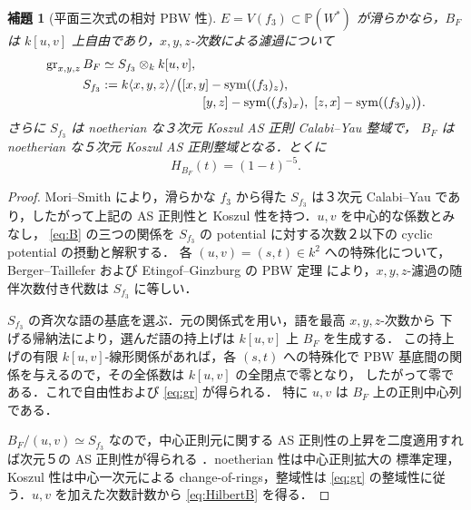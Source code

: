\documentclass[11pt,a4paper]{ltjsarticle}
\numberwithin{equation}{section}
\newtheorem{lemma}[theorem]{補題}
\newcommand{\PP}{\mathbb P}
\newcommand{\gr}{\operatorname{gr}}
\newcommand{\Symm}{\operatorname{sym}}
\begin{document}
\begin{lemma}[平面三次式の相対 PBW 性]\label{lem:pbw}
$E=V(f_3)\subset\PP(W^*)$ が滑らかなら，$B_F$ は
$k[u,v]$ 上自由であり，$x,y,z$-次数による濾過について
\begin{align}\label{eq:gr}
 \gr_{x,y,z}B_F&\simeq S_{f_3}\otimes_k k[u,v],\\
 S_{f_3}&:=k\langle x,y,z\rangle/\bigl([x,y]-\Symm((f_3)_z),\ 
\notag\\[-2pt]
 &\hspace{8em}[y,z]-\Symm((f_3)_x),\ [z,x]-\Symm((f_3)_y)\bigr).
\end{align}
さらに $S_{f_3}$ は noetherian な３次元 Koszul AS 正則 Calabi--Yau 整域で，
$B_F$ は noetherian な５次元 Koszul AS 正則整域となる．とくに
\begin{equation}\label{eq:HilbertB}
 H_{B_F}(t)=(1-t)^{-5}.
\end{equation}
\end{lemma}
\begin{proof}
Mori--Smith \cite[Theorem~4.2(1)]{MS} により，滑らかな $f_3$ から得た
$S_{f_3}$ は３次元 Calabi--Yau であり，したがって上記の
AS 正則性と Koszul 性を持つ．$u,v$ を中心的な係数とみなし，
\eqref{eq:B} の三つの関係を
$S_{f_3}$ の potential に対する次数２以下の cyclic potential の摂動と解釈する．
各 $(u,v)=(s,t)\in k^2$ への特殊化について，
Berger--Taillefer および Etingof--Ginzburg の PBW 定理
\cite[Proposition~7.3.1(ii)]{EG} により，$x,y,z$-濾過の随伴次数付き代数は
$S_{f_3}$ に等しい．

$S_{f_3}$ の斉次な語の基底を選ぶ．元の関係式を用い，語を最高 $x,y,z$-次数から
下げる帰納法により，選んだ語の持上げは $k[u,v]$ 上 $B_F$ を生成する．
この持上げの有限 $k[u,v]$-線形関係があれば，各 $(s,t)$ への特殊化で
PBW 基底間の関係を与えるので，その全係数は $k[u,v]$ の全閉点で零となり，
したがって零である．これで自由性および \eqref{eq:gr} が得られる．
特に $u,v$ は $B_F$ 上の正則中心列である．

$B_F/(u,v)\simeq S_{f_3}$ なので，中心正則元に関する
AS 正則性の上昇を二度適用すれば次元５の AS 正則性が得られる
\cite[Propositions~2.1, 2.3]{CKS}．noetherian 性は中心正則拡大の
標準定理，Koszul 性は中心一次元による change-of-rings，整域性は
\eqref{eq:gr} の整域性に従う．$u,v$ を加えた次数計数から \eqref{eq:HilbertB} を得る．
\end{proof}
\end{document}
